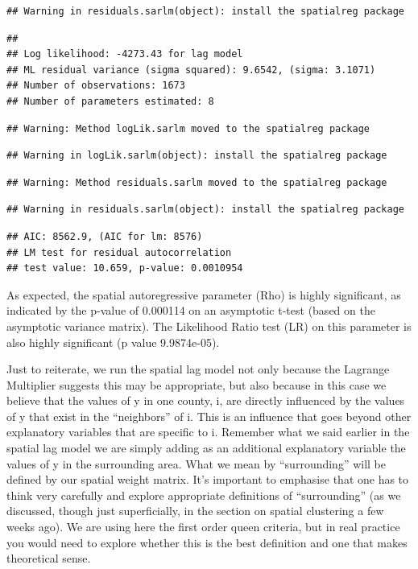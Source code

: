 \documentclass[]{book}
\begin{document}
\begin{verbatim}
## Warning in residuals.sarlm(object): install the spatialreg package
\end{verbatim}

\begin{verbatim}
## 
## Log likelihood: -4273.43 for lag model
## ML residual variance (sigma squared): 9.6542, (sigma: 3.1071)
## Number of observations: 1673 
## Number of parameters estimated: 8
\end{verbatim}

\begin{verbatim}
## Warning: Method logLik.sarlm moved to the spatialreg package
\end{verbatim}

\begin{verbatim}
## Warning in logLik.sarlm(object): install the spatialreg package
\end{verbatim}

\begin{verbatim}
## Warning: Method residuals.sarlm moved to the spatialreg package
\end{verbatim}

\begin{verbatim}
## Warning in residuals.sarlm(object): install the spatialreg package
\end{verbatim}

\begin{verbatim}
## AIC: 8562.9, (AIC for lm: 8576)
## LM test for residual autocorrelation
## test value: 10.659, p-value: 0.0010954
\end{verbatim}

As expected, the spatial autoregressive parameter (Rho) is highly significant, as indicated by the p-value of 0.000114 on an asymptotic t-test (based on the asymptotic variance matrix). The Likelihood Ratio test (LR) on this parameter is also highly significant (p value 9.9874e-05).

Just to reiterate, we run the spatial lag model not only because the Lagrange Multiplier suggests this may be appropriate, but also because in this case we believe that the values of y in one county, i, are directly influenced by the values of y that exist in the ``neighbors'' of i. This is an influence that goes beyond other explanatory variables that are specific to i. Remember what we said earlier in the spatial lag model we are simply adding as an additional explanatory variable the values of y in the surrounding area. What we mean by ``surrounding'' will be defined by our spatial weight matrix. It's important to emphasise that one has to think very carefully and explore appropriate definitions of ``surrounding'' (as we discussed, though just superficially, in the section on spatial clustering a few weeks ago). We are using here the first order queen criteria, but in real practice you would need to explore whether this is the best definition and one that makes theoretical sense.
\end{document}
